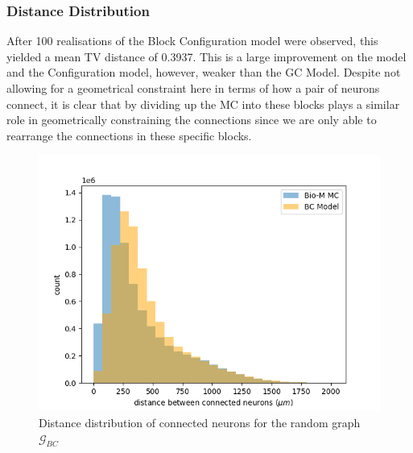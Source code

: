 \subsubsection{Distance Distribution}
After 100 realisations of the Block Configuration model were observed, this yielded a mean TV distance of 0.3937. This is a large improvement on the \ER model and the Configuration model, however, weaker than the GC Model. Despite not allowing for a geometrical constraint here in terms of how a pair of neurons connect, it is clear that by dividing up the MC into these blocks plays a similar role in geometrically constraining the connections since we are only able to rearrange the connections in these specific blocks. 
\begin{figure}[H]
\begin{center}
\captionsetup{justification=centering}
\includegraphics[width=12cm]{BC/Block_dist_distr.png}
\caption{Distance distribution of connected neurons for the random graph $\mathcal{G}_{BC}$}
\end{center}
\end{figure}

